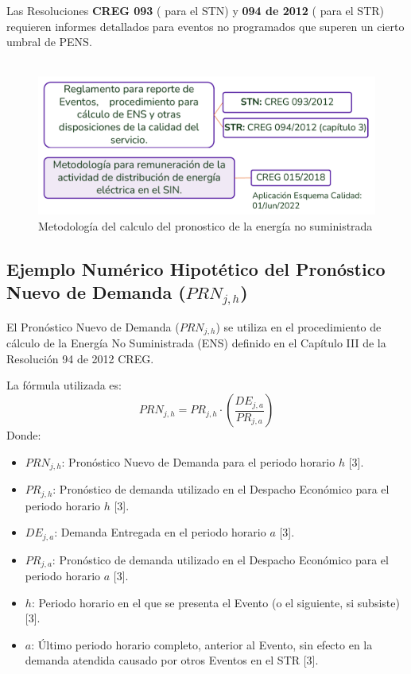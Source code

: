 \documentclass[a5paper]{book}%
\begin{document}
  Las Resoluciones \textbf{CREG 093} ( para el \ac{STN}) y \textbf{094 de 2012} ( para el STR) requieren informes detallados para eventos no programados que superen un cierto umbral de \ac{PENS}.\\\\

\begin{figure}[H]
   \centering
   \caption{Metodología del calculo del pronostico de la energía no
     suministrada}
   \label{fig:ens}
   \includegraphics[width=\linewidth]{calculo_ens.png}
 \end{figure}

 
\subsection*{Ejemplo Numérico Hipotético del Pronóstico Nuevo de Demanda ($PRN_{j,h}$)}

El Pronóstico Nuevo de Demanda ($PRN_{j,h}$) se utiliza en el procedimiento de cálculo de la Energía No Suministrada (ENS) definido en el Capítulo III de la Resolución 94 de 2012 CREG.

La fórmula utilizada es:
\begin{equation}
	PRN_{j,h} = PR_{j,h} \cdot \left( \frac{DE_{j,a}}{PR_{j,a}} \right)
\end{equation}
Donde:
\begin{itemize}
	\item $PRN_{j,h}$: Pronóstico Nuevo de Demanda para el periodo horario $h$ [3].
	\item $PR_{j,h}$: Pronóstico de demanda utilizado en el Despacho Económico para el periodo horario $h$ [3].
	\item $DE_{j,a}$: Demanda Entregada en el periodo horario $a$ [3].
	\item $PR_{j,a}$: Pronóstico de demanda utilizado en el Despacho Económico para el periodo horario $a$ [3].
	\item $h$: Periodo horario en el que se presenta el Evento (o el siguiente, si subsiste) [3].
	\item $a$: Último periodo horario completo, anterior al Evento, sin efecto en la demanda atendida causado por otros Eventos en el STR [3].
\end{itemize}
\end{document}
